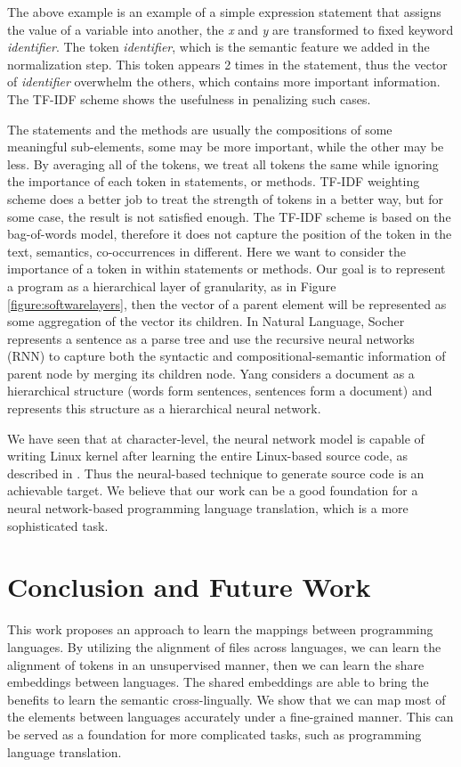 The above example is an example of a simple expression statement that assigns the value of a variable into another, the \textit{x} and \textit{y} are transformed to fixed keyword \textit{identifier}. The token \textit{identifier}, which is the semantic feature we added in the normalization step. This token appears 2 times in the statement, thus the vector of \textit{identifier} overwhelm the others, which contains more important information. The TF-IDF scheme shows the usefulness in penalizing such cases.

The statements and the methods are usually the compositions of some meaningful sub-elements, some may be more important, while the other may be less. By averaging all of the tokens, we treat all tokens the same while ignoring the importance of each token in statements, or methods. TF-IDF weighting scheme does a better job to treat the strength of tokens in a better way, but for some case, the result is not satisfied enough. The TF-IDF scheme is based on the bag-of-words model, therefore it does not capture the position of the token in the text, semantics, co-occurrences in different. Here we want to consider the importance of a token in within statements or methods. Our goal is to represent a program as a hierarchical layer of granularity, as in Figure \ref{figure:softwarelayers}, then the vector of a parent element will be represented as some aggregation of the vector its children. In Natural Language, Socher \cite{socher2011parsing} represents a sentence as a parse tree and use the recursive neural networks (RNN) to capture both the syntactic and compositional-semantic information of parent node by merging its children node. Yang \cite{yang2016hierarchical} considers a document as a hierarchical structure (words form sentences, sentences form a document) and represents this structure as a hierarchical neural network.



We have seen that at character-level, the neural network model is capable of writing Linux kernel after learning the entire Linux-based source code, as described in \cite{Karpathy}. Thus the neural-based technique to generate source code is an achievable target. We believe that our work can be a good foundation for a neural network-based programming language translation, which is a more sophisticated task. 

\section{Conclusion and Future Work}
This work proposes an approach to learn the mappings between programming languages. By utilizing the alignment of files across languages, we can learn the alignment of tokens in an unsupervised manner, then we can learn the share embeddings between languages. The shared embeddings are able to bring the benefits to learn the semantic cross-lingually. We show that we can map most of the elements between languages accurately under a fine-grained manner. This can be served as a foundation for more complicated tasks, such as programming language translation. 

